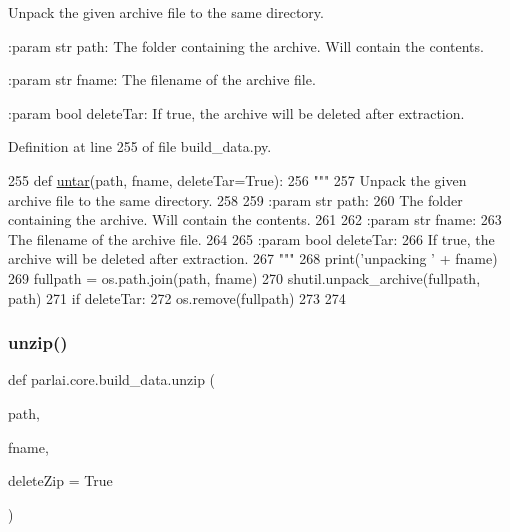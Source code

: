 \begin{DoxyVerb}Unpack the given archive file to the same directory.

:param str path:
    The folder containing the archive. Will contain the contents.

:param str fname:
    The filename of the archive file.

:param bool deleteTar:
    If true, the archive will be deleted after extraction.
\end{DoxyVerb}
 

Definition at line 255 of file build\+\_\+data.\+py.


\begin{DoxyCode}
255 \textcolor{keyword}{def }\hyperlink{namespaceparlai_1_1core_1_1build__data_a4d33f97932682a8513904022d852f3cf}{untar}(path, fname, deleteTar=True):
256     \textcolor{stringliteral}{"""}
257 \textcolor{stringliteral}{    Unpack the given archive file to the same directory.}
258 \textcolor{stringliteral}{}
259 \textcolor{stringliteral}{    :param str path:}
260 \textcolor{stringliteral}{        The folder containing the archive. Will contain the contents.}
261 \textcolor{stringliteral}{}
262 \textcolor{stringliteral}{    :param str fname:}
263 \textcolor{stringliteral}{        The filename of the archive file.}
264 \textcolor{stringliteral}{}
265 \textcolor{stringliteral}{    :param bool deleteTar:}
266 \textcolor{stringliteral}{        If true, the archive will be deleted after extraction.}
267 \textcolor{stringliteral}{    """}
268     print(\textcolor{stringliteral}{'unpacking '} + fname)
269     fullpath = os.path.join(path, fname)
270     shutil.unpack\_archive(fullpath, path)
271     \textcolor{keywordflow}{if} deleteTar:
272         os.remove(fullpath)
273 
274 
\end{DoxyCode}
\mbox{\label{namespaceparlai_1_1core_1_1build__data_a7cbfdf246ca40dc3ed9f8613deb14a00}} 
\subsubsection{\texorpdfstring{unzip()}{unzip()}}
{\footnotesize\ttfamily def parlai.\+core.\+build\+\_\+data.\+unzip (\begin{DoxyParamCaption}\item[{}]{path,  }\item[{}]{fname,  }\item[{}]{delete\+Zip = {\ttfamily True} }\end{DoxyParamCaption})}

